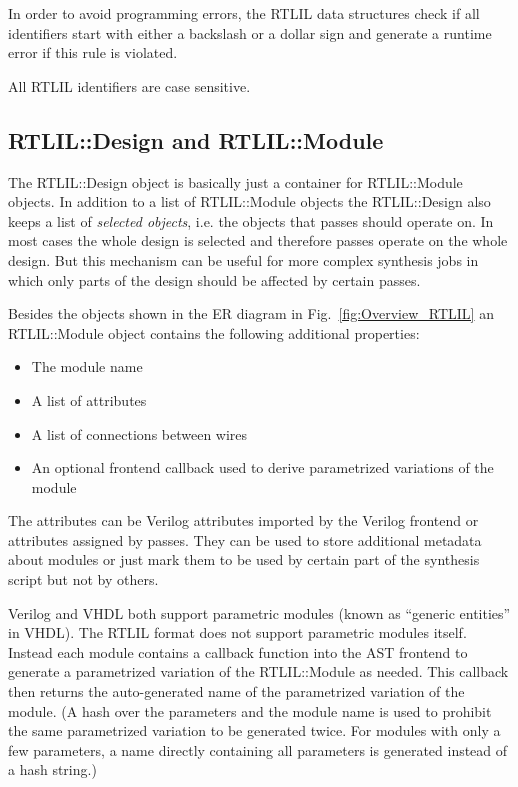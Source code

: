 In order to avoid programming errors, the RTLIL data structures check if all
identifiers start with either a backslash or a dollar sign and generate a
runtime error if this rule is violated.

All RTLIL identifiers are case sensitive.

\subsection{RTLIL::Design and RTLIL::Module}

The RTLIL::Design object is basically just a container for RTLIL::Module objects. In addition to
a list of RTLIL::Module objects the RTLIL::Design also keeps a list of {\it selected objects}, i.e.
the objects that passes should operate on. In most cases the whole design is selected and therefore
passes operate on the whole design. But this mechanism can be useful for more complex synthesis jobs
in which only parts of the design should be affected by certain passes.

Besides the objects shown in the ER diagram in Fig.~\ref{fig:Overview_RTLIL} an RTLIL::Module object
contains the following additional properties:

\begin{itemize}
\item The module name
\item A list of attributes
\item A list of connections between wires
\item An optional frontend callback used to derive parametrized variations of the module
\end{itemize}

The attributes can be Verilog attributes imported by the Verilog frontend or attributes assigned
by passes. They can be used to store additional metadata about modules or just mark them to be
used by certain part of the synthesis script but not by others.

Verilog and VHDL both support parametric modules (known as ``generic entities'' in VHDL). The RTLIL
format does not support parametric modules itself. Instead each module contains a callback function
into the AST frontend to generate a parametrized variation of the RTLIL::Module as needed. This
callback then returns the auto-generated name of the parametrized variation of the module. (A hash
over the parameters and the module name is used to prohibit the same parametrized variation to be
generated twice. For modules with only a few parameters, a name directly containing all parameters
is generated instead of a hash string.)

